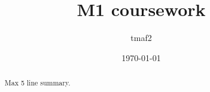 \documentclass[12pt,a4paper]{report}
\title{M1 coursework}
\author{tmaf2}
\date{\today}
\begin{document}
\maketitle

\begin{abstract}
Max 5 line summary.
\end{abstract}

\tableofcontents

\chapter{}

\chapter{}

\chapter{}

\chapter{}

\chapter{}
\end{document}

